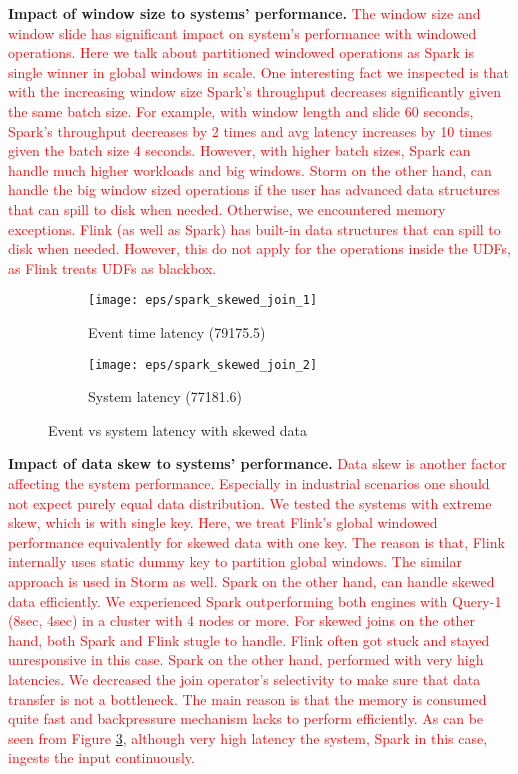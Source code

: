 {\textbf{Impact of window size to systems' performance.}
\textcolor{red}{The window size and window slide has significant impact on system's performance with windowed operations. Here we talk about partitioned windowed operations as Spark is single winner in global windows in scale. One interesting fact we inspected is that with the increasing window size Spark's throughput decreases significantly given the same batch size. For example, with window length and slide 60 seconds, Spark's throughput decreases by 2 times and avg latency increases by 10 times given the batch size 4 seconds. However, with higher batch sizes, Spark can handle much higher workloads and big windows. Storm on the other hand, can handle the big window sized operations if the user has advanced data structures that can spill to disk when needed. Otherwise, we encountered memory exceptions. Flink (as well as Spark) has built-in data structures that can spill to disk when needed. However, this do not apply for the operations inside the UDFs, as Flink treats UDFs as blackbox. }


\begin{figure}
	\centering
	\begin{subfigure}[b]{0.5\textwidth}
		\texttt{[image: eps/spark\_skewed\_join\_1]}
		
		\caption{Event time latency (79175.5)}
		\label{fig_spark_join_2node_th_max_ts}
	\end{subfigure}%
	\begin{subfigure}[b]{0.5\textwidth}
		\texttt{[image: eps/spark\_skewed\_join\_2]}
		
		\caption{System latency (77181.6) }
		\label{fig_spark_join_4node_th_max_ts}
	\end{subfigure}%
	\caption{Event vs system latency with skewed data}
	\label{skew}
\end{figure}

\textbf{Impact of data skew to systems' performance.}
\textcolor{red}{Data skew is another factor affecting the system performance. Especially in industrial scenarios one should not expect purely equal data distribution. We tested the systems with extreme skew, which is with single key. Here, we treat Flink's global windowed performance equivalently for skewed data with one key. The reason is that, Flink internally uses static dummy key to partition global windows. The similar approach is used in Storm as well. Spark on the other hand, can handle skewed data efficiently. We experienced Spark outperforming both engines with Query-1 (8sec, 4sec) in a cluster with 4 nodes or more. For skewed joins on the other hand, both Spark and Flink stugle to handle. Flink often got stuck and stayed unresponsive in this case. Spark on the other hand, performed with very high latencies. We decreased the join operator's selectivity to make sure that data transfer is not a bottleneck. The main reason is that the memory is consumed quite fast and backpressure mechanism lacks to perform efficiently. As can be seen from Figure \ref{skew}, although very high latency the system, Spark in this case, ingests the input continuously. }



}
